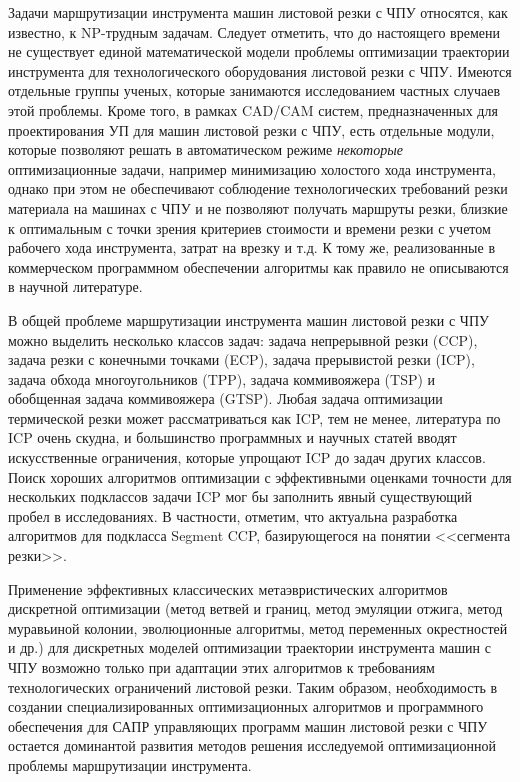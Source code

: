 Задачи маршрутизации инструмента машин листовой резки с ЧПУ относятся,
как известно,
к
NP-трудным задачам.
Следует отметить,
что до настоящего времени не существует единой математической модели
проблемы оптимизации траектории инструмента для технологического оборудования листовой резки с ЧПУ.
Имеются отдельные группы ученых, которые занимаются исследованием частных случаев этой проблемы.
Кроме того, в рамках CAD/CAM систем,
предназначенных для проектирования УП для машин листовой резки с ЧПУ,
есть отдельные модули, которые позволяют решать
в автоматическом режиме
\textit{некоторые} оптимизационные задачи,
например минимизацию холостого хода инструмента,
однако при этом не обеспечивают соблюдение технологических требований резки материала на машинах с ЧПУ
и не позволяют получать маршруты резки,
близкие к оптимальным с точки зрения критериев стоимости и времени резки с учетом рабочего хода инструмента,
затрат на врезку и т.д.
К тому же, реализованные в коммерческом программном обеспечении алгоритмы
как правило не описываются в научной литературе.

В общей проблеме маршрутизации инструмента машин листовой резки с ЧПУ
можно выделить несколько классов задач:
задача непрерывной резки (CCP),
задача резки с конечными точками (ECP),
задача прерывистой резки (ICP),
задача обхода многоугольников (TPP),
задача коммивояжера (TSP)
и обобщенная задача коммивояжера (GTSP).
Любая задача оптимизации термической резки может рассматриваться как ICP,
тем не менее, литература по ICP очень скудна,
и большинство программных и научных статей вводят искусственные ограничения,
которые упрощают ICP до задач других классов.
Поиск хороших алгоритмов оптимизации
с эффективными оценками точности для нескольких подклассов задачи
ICP
мог бы заполнить явный существующий пробел в исследованиях.
В частности, отметим,
что актуальна разработка алгоритмов для подкласса Segment CCP,
базирующегося на понятии <<сегмента резки>>.

Применение эффективных классических метаэвристических алгоритмов дискретной оптимизации
(метод ветвей и границ, метод эмуляции отжига, метод муравьиной колонии, эволюционные алгоритмы, метод переменных окрестностей и др.)
для дискретных моделей оптимизации траектории инструмента машин с ЧПУ
возможно только при адаптации этих алгоритмов к требованиям технологических ограничений листовой резки.
Таким образом,
необходимость в создании специализированных оптимизационных
алгоритмов и программного обеспечения
для САПР управляющих программ машин листовой резки с ЧПУ
остается
доминантой развития методов решения исследуемой оптимизационной проблемы
маршрутизации инструмента.

